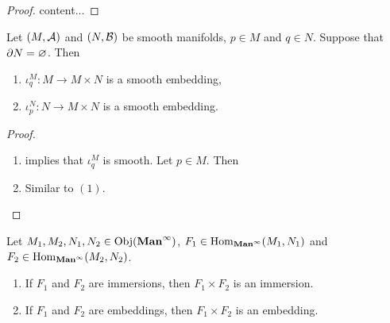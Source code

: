 \documentclass{book}
\begin{document}
	\begin{proof}
		content...
	\end{proof}

	\begin{ex} 
		Let $(M, \mathcal{A})$ and $(N, \mathcal{B})$ be smooth manifolds, $p \in M$ and $q \in N$. Suppose that $\partial N = \varnothing$. Then 
		\begin{enumerate}
			\item $\iota^M_q: M \rightarrow M \times N$ is a smooth embedding,
			\item $\iota^N_p: N \rightarrow M \times N$ is a smooth embedding.
		\end{enumerate}
	\end{ex}

	\begin{proof}\
		\begin{enumerate}
			\item {} implies that $\iota_q^M$ is smooth. Let $p \in M$. Then 
			\item Similar to $(1)$.
		\end{enumerate}
	\end{proof}

\begin{ex} 
	Let $M_1, M_2, N_1, N_2 \in \operatorname{Obj}(\operatorname*{\text{\textbf{Man}}^{\infty}})$, $F_1 \in \operatorname{Hom}_{\operatorname*{\text{\textbf{Man}}^{\infty}}}(M_1, N_1)$ and $F_2 \in \operatorname{Hom}_{\operatorname*{\text{\textbf{Man}}^{\infty}}}(M_2, N_2)$. 
	\begin{enumerate}
		\item If $F_1$ and $F_2$ are immersions, then $F_1 \times F_2$ is an immersion. 
		\item If $F_1$ and $F_2$ are embeddings, then $F_1 \times F_2$ is an embedding. 
	\end{enumerate}
\end{ex}
\end{document}
